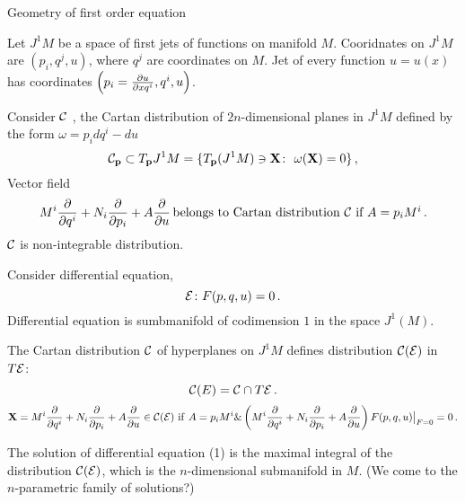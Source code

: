

\baselineskip=14pt
\def\vare {\varepsilon}
\def\t {\tilde}
\def\a {\alpha}
\def\K {{\bf K}}
\def\N {{\bf N}}
\def\C {{\cal C}}
\def\L {{\cal L}}
\def\E {{\cal E}}
\def\s {{\sigma}}
\def\S {{\Sigma}}
\def\p{\partial}
\def\vare{{\varepsilon}}
\def\Q {{\bf Q}}
\def\D {{\cal D}}
\def\G {{\Gamma}}
\def\Z {{\bf Z}}
\def\R  {{\bf R}}
\def\l {\lambda}
\def\ll {{\bf l}}
\def\degree {{\bf {\rm degree}\,\,}}
\def \finish {${\,\,\vrule height1mm depth2mm width 8pt}$}
\def \m {\medskip}
\def\p {\partial}
\def\r {{\bf r}}
\def\pt {{\bf p}}
\def\v {{\bf v}}
\def\n {{\bf n}}
\def\t {{\bf t}}
\def\b {{\bf b}}
\def\c {{\bf c }}
\def\e{{\bf e}}
\def\ac {{\bf a}}
\def \X   {{\bf X}}
\def \Y   {{\bf Y}}
\def \x   {{\bf x}}
\def \y   {{\bf y}}
\def\w {{\omega}}
\def \Tr  {{\rm Tr\,}}

    \centerline {Geometry of first order equation}

  Let  $J^1M$  be a space of first jets of functions on 
manifold $M$. Cooridnates on $J^1M$ are $(p_i,q^j,u)$,
where $q^j$ are coordinates on $M$.  Jet of every function  $u=u(x)$
has coordinates $\left(p_i={\p u\over \p x q^i},q^i,u\right)$.

Consider  $\C$ , the Cartan 
 distribution of $2n$-dimensional planes in $J^1M$
defined by the form $\w=p_idq^i-du$
                      $$
\C_\pt\subset T_\pt J^1M=\{
T_\pt (J^1M)\ni\X\colon\,\,\w(\X)=0 
                    \}\,,
                      $$
Vector field  
     $$
M^i{\p\over \p q^i}+
N_i{\p\over \p p_i}+A{\p\over \p u}\,
\hbox{belongs to Cartan distribution $\C$ if $A=p_iM^i$}\,.
      $$
$\C$ is non-integrable distribution.                



Consider differential equation,  
      $$
\E\colon       F(p,q,u)=0\,.
      $$
Differential equation is sumbmanifold of codimension $1$
in the space $J^1(M)$.

The Cartan distribution  $\C$ of hyperplanes on $J^1M$ 
defines distribution  $\C(\E)$ in $T\E$:
                  $$
\C(E)=\C\cap T\E\,.
                   $$
         $$
\X=
M^i{\p\over \p q^i}+
N_i{\p\over \p p_i}+A{\p\over \p u}\in \C(\E)\,\, {\rm if}\,\,
 A=p_iM^i \& 
\left(M^i{\p\over \p q^i}+
N_i{\p\over \p p_i}+A{\p\over \p u}\right)F(p,q,u)\big\vert_{F=0}=0\,.
          $$



The solution of differential equation (1) is the maximal integral
  of the distribution
$\C(\E)$, which is the $n$-dimensional
 submanifold in $M$.  
(We come to the $n$-parametric family of solutions?)


